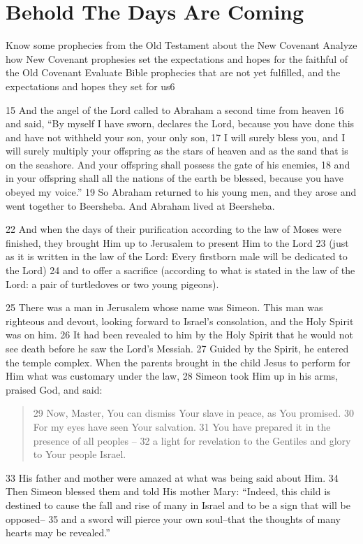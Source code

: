 \chapter{Behold The Days Are Coming}
\begin{goals}
\goal Know some prophecies from the Old Testament about the New Covenant
\goal Analyze how New Covenant prophesies set the expectations and hopes for the faithful of the Old Covenant
\goal Evaluate Bible prophecies that are not yet fulfilled, and the expectations and hopes they set for us6
\end{goals}
\begin{bible}


15 And the angel of the Lord called to Abraham a second time from heaven 16 and said, ``By myself I have sworn, declares the Lord, because you have done this and have not withheld your son, your only son, 17 I will surely bless you, and I will surely multiply your offspring as the stars of heaven and as the sand that is on the seashore. And your offspring shall possess the gate of his enemies, 18 and in your offspring shall all the nations of the earth be blessed, because you have obeyed my voice.'' 19 So Abraham returned to his young men, and they arose and went together to Beersheba. And Abraham lived at Beersheba.

22 And when the days of their purification according to the law of Moses were finished, they brought Him up to Jerusalem to present Him to the Lord 23 (just as it is written in the law of the Lord: Every firstborn male will be dedicated to the Lord) 24 and to offer a sacrifice (according to what is stated in the law of the Lord: a pair of turtledoves or two young pigeons).

25 There was a man in Jerusalem whose name was Simeon. This man was righteous and devout, looking forward to Israel's consolation, and the Holy Spirit was on him. 26 It had been revealed to him by the Holy Spirit that he would not see death before he saw the Lord's Messiah. 27 Guided by the Spirit, he entered the temple complex. When the parents brought in the child Jesus to perform for Him what was customary under the law, 28 Simeon took Him up in his arms, praised God, and said:
\begin{quote}
29 Now, Master, You can dismiss Your slave in peace, as You promised.
30 For my eyes have seen Your salvation.
31 You have prepared it in the presence of all peoples --
32 a light for revelation to the Gentiles and glory to Your people Israel.
\end{quote}
33 His father and mother were amazed at what was being said about Him. 34 Then Simeon blessed them and told His mother Mary: ``Indeed, this child is destined to cause the fall and rise of many in Israel and to be a sign that will be opposed-- 35 and a sword will pierce your own soul--that the thoughts of many hearts may be revealed.''


\end{bible}
